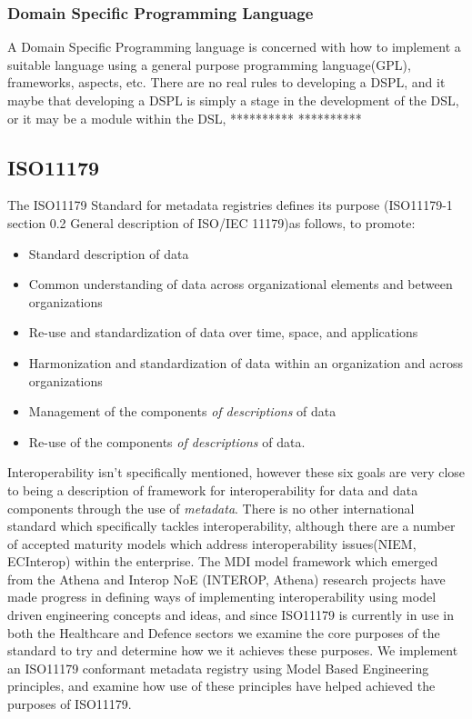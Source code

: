 \documentclass{llncs}
\begin{document}
\subsubsection{Domain Specific Programming Language}	
A Domain Specific Programming language is concerned with how to implement a suitable language using a general purpose programming language(GPL), frameworks, aspects, etc. There are no real rules to developing a DSPL, and it maybe that developing a DSPL is simply a stage in the development of the DSL, or it may be a module within the DSL, 
**********
**********


\subsection{ISO11179}

The ISO11179 Standard for metadata registries defines its purpose (ISO11179-1 section 0.2 General description of ISO/IEC 11179)as follows,
\newline
to promote:
\begin{itemize}
\item Standard description of data
\item Common understanding of data across organizational elements and between organizations
\item Re-use and standardization of data over time, space, and applications
\item Harmonization and standardization of data within an organization and across organizations
\item Management of the components \emph{of descriptions} of data
\item Re-use of the components \emph{of descriptions} of data.
\end{itemize}

Interoperability isn't specifically mentioned, however these six goals are very close to being a description of framework for interoperability for data and data components through the use of \emph{metadata}. There is no other international standard which specifically tackles interoperability, although there are a number of accepted maturity models which address interoperability issues(NIEM, ECInterop) within the enterprise.  The MDI model framework which emerged from the Athena and Interop NoE (INTEROP, Athena) research projects have made progress in defining ways of implementing interoperability using model driven engineering concepts and ideas, and since ISO11179 is currently in use in both the Healthcare and Defence sectors we examine the core purposes of the standard to try and determine how we it achieves these purposes. We implement an ISO11179 conformant metadata registry using Model Based Engineering principles, and examine how use of these principles have helped achieved the purposes of ISO11179. 
\end{document}
